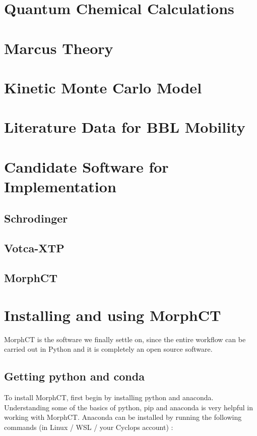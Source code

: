 \documentclass{article}
\begin{document}
\section{Quantum Chemical Calculations}

\section{Marcus Theory}



\section{Kinetic Monte Carlo Model}

\section{Literature Data for BBL Mobility}

\section{Candidate Software for Implementation}

\subsection{Schrodinger}

\subsection{Votca-XTP}

\subsection{MorphCT}


\section{Installing and using MorphCT}

MorphCT is the software we finally settle on, since the entire workflow can be carried out in Python and it is completely an open source software. 

\subsection{Getting python and conda}

To install MorphCT, first begin by installing python and anaconda. Understanding some of the basics of python, pip and anaconda is very helpful in working with MorphCT. Anaconda can be installed by running the following commands (in Linux / WSL / your Cyclops account) :
\end{document}

